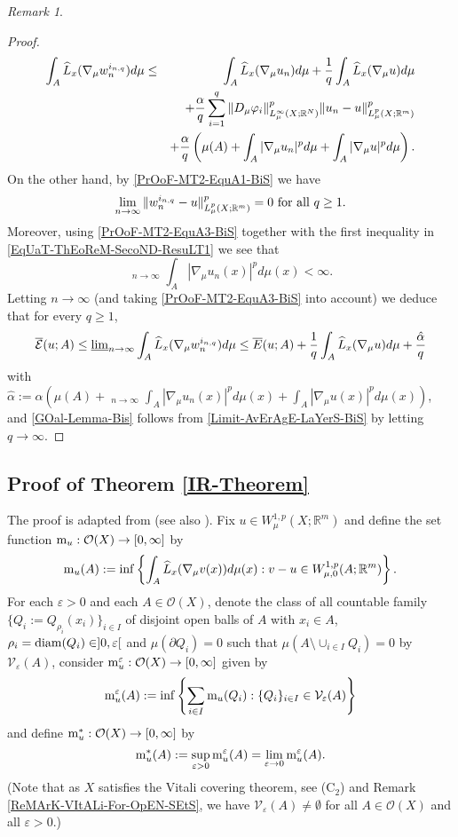\documentclass[10pt]{amsart}
\numberwithin{equation}{section}
\theoremstyle{definition}
\theoremstyle{remark}
\newtheorem{remark}[theorem]{Remark}
\begin{document}
\begin{remark}
\begin{proof}
\begin{eqnarray}
\int_{A}\widehat{L}_x(\nabla_\mu w_n^{i_{n,q}})d\mu&\leq&\int_A\widehat{L}_x(\nabla_\mu u_n)d\mu+{1\over q}\int_A\widehat{L}_x(\nabla_\mu u)d\mu\nonumber\\
&&+{\alpha\over q}\sum_{i=1}^q\|D_\mu\varphi_i\|^p_{L^\infty_\mu(X;{{\mathbb R}}^N)}\|u_n-u\|^p_{L^p_\mu(X;{{\mathbb R}}^m)}\nonumber\\
&&+{\alpha\over q}\left(\mu(A)+\int_A|\nabla_\mu u_n|^pd\mu+\int_A|\nabla_\mu u|^pd\mu\right).\nonumber
\end{eqnarray}
On the other hand, by \eqref{PrOoF-MT2-EquA1-BiS} we have
$$
\lim_{n\to\infty}\|w_n^{i_{n,q}}-u\|^p_{L^p_\mu(X;{{\mathbb R}}^m)}=0\hbox{ for all }q\geq 1.
$$
Moreover, using \eqref{PrOoF-MT2-EquA3-BiS}  together with the first inequality in \eqref{EqUaT-ThEoReM-SecoND-ResuLT1} we see that
$$
{\mathop{\overline{\lim}}}_{n\to\infty}\int_A|\nabla_\mu u_n(x)|^pd\mu(x)<\infty.
$$
Letting $n\to\infty$ (and taking \eqref{PrOoF-MT2-EquA3-BiS} into account) we deduce that for every $q\geq 1$,
\begin{equation}\label{Limit-AvErAgE-LaYerS-BiS}
\overline{\mathcal{E}}(u;A)\leq{\mathop{\underline{\lim}}}_{n\to\infty}\int_{A}\widehat{L}_x(\nabla_\mu w_n^{i_{n,q}})d\mu\leq\overline{E}(u;A)+{1\over q}\int_A\widehat{L}_x(\nabla_\mu u)d\mu+{\hat\alpha\over q}
\end{equation}
with $\hat\alpha:=\alpha(\mu(A)+{\mathop{\overline{\lim}}}_{n\to\infty}\int_A|\nabla_\mu u_n(x)|^pd\mu(x)+\int_A|\nabla_\mu u(x)|^pd\mu(x))$, and \eqref{GOal-Lemma-Bis} follows from \eqref{Limit-AvErAgE-LaYerS-BiS} by letting $q\to\infty$. 
\end{proof}
\end{remark}

\subsection{Proof of Theorem \ref{IR-Theorem}} The proof is adapted from \cite[Lemmas 3.3 and 3.5]{boufonmas98} (see also \cite[\S 2]{bouchitte-bellieud00}). Fix $u\in W^{1,p}_\mu(X;{{\mathbb R}}^m)$ and define the set function ${\rm m}_u:\mathcal{O}(X)\to[0,\infty]$ by
$$
{\rm m}_u(A):=\inf\left\{\int_{A}\widehat{L}_x(\nabla_\mu v(x))d\mu(x):v-u\in W^{1,p}_{\mu,0}(A;{{\mathbb R}}^m)\right\}.
$$
For each ${\varepsilon}>0$ and each $A\in\mathcal{O}(X)$, denote the class of all countable family $\{Q_i:=Q_{\rho_i}(x_i)\}_{i\in I}$ of disjoint open balls of $A$ with $x_i\in A$, $\rho_i={\rm diam}(Q_i)\in]0,{\varepsilon}[$ and $\mu(\partial Q_i)=0$ such that $\mu(A\setminus\cup_{i\in I}Q_i)=0$ by $\mathcal{V}_{\varepsilon}(A)$, consider ${\rm m}_u^{\varepsilon}:\mathcal{O}(X)\to[0,\infty]$ given by
$$
{\rm m}_u^{\varepsilon}(A):=\inf\left\{\sum_{i\in I}{\rm m}_u(Q_i):\{Q_i\}_{i\in I}\in \mathcal{V}_{\varepsilon}(A)\right\}
$$
and define ${\rm m}^*_u:\mathcal{O}(X)\to[0,\infty]$ by 
$$
{\rm m}^*_u(A):=\sup_{{\varepsilon}>0}{\rm m}^{\varepsilon}_u(A)=\lim_{{\varepsilon}\to0}{\rm m}_u^{\varepsilon}(A).
$$
(Note that as $X$ satisfies the Vitali covering theorem, see (C$_2$) and Remark \ref{ReMArK-VItALi-For-OpEN-SEtS}, we have $\mathcal{V}_{\varepsilon}(A)\not=\emptyset$ for all $A\in\mathcal{O}(X)$ and all ${\varepsilon}>0$.) 
\end{document}
